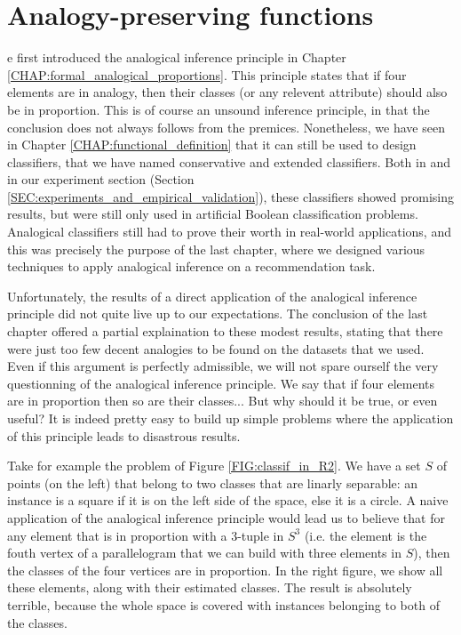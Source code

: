 \chapter{Analogy-preserving functions}

e first introduced the analogical inference principle in Chapter
\ref{CHAP:formal_analogical_proportions}. This principle states that if four
elements are in analogy, then their classes (or any relevent attribute) should
also be in proportion. This is of course an unsound inference principle, in
that the conclusion does not always follows from the premices. Nonetheless, we
have seen in Chapter \ref{CHAP:functional_definition} that it can still be used
to design classifiers, that we have named conservative and extended
classifiers.  Both in \cite{BayMicDelIJCAI07} and in our experiment section
(Section \ref{SEC:experiments_and_empirical_validation}), these classifiers
showed promising results, but were still only used in artificial Boolean
classification problems. Analogical classifiers still had to prove their worth
in real-world applications, and this was precisely the purpose of the last
chapter, where we designed various techniques to apply analogical inference on
a recommendation task.

Unfortunately, the results of a direct application of the analogical inference
principle did not quite live up to our expectations. The conclusion of the last
chapter offered a partial explaination to these modest results, stating that
there were just too few decent analogies to be found on the datasets that we
used. Even if this argument is perfectly admissible, we will not spare ourself
the very questionning of the analogical inference principle. We say that if
four elements are in proportion then so are their classes... But why should it
be true, or even useful? It is indeed pretty easy to build up simple problems
where the application of this principle leads to disastrous results.

Take for example the problem of Figure \ref{FIG:classif_in_R2}. We have
a set $S$ of points (on the left) that belong to two classes that are linarly
separable: an instance is a square if it is on the left side of the space, else
it is a circle. A naive application of the analogical inference principle would
lead us to believe that for any element that is in proportion with a $3$-tuple
in $S^3$ (i.e. the element is the fouth vertex of a parallelogram that we can
build with three elements in $S$), then the classes of the four vertices are in
proportion. In the right figure, we show all these elements, along with their
estimated classes. The result is absolutely terrible, because the whole space is
covered with instances belonging to both of the classes.

